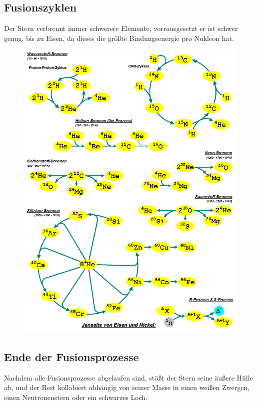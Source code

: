 \documentclass[final]{summery_5.0}
\begin{document}
\subsection{Fusionszyklen}
Der Stern verbrennt immer schwerere Elemente, vorrausgesetzt er ist schwer genug, bis zu Eisen, da dieses die größte Bindungsenergie pro Nukleon hat. 
\begin{figure}[H]
    \centering
    \includegraphics[width=1\textwidth]{schaalenbrenne.png}
\end{figure}

\subsection{Ende der Fusionsprozesse}
Nachdem alle Fusionsprozesse abgelaufen sind, stößt der Stern seine äußere Hülle ab, und der Rest kollabiert abhängig von seiner Masse in einen weißen Zwergen, einen Neutronenstern oder ein schwarzes Loch.
\end{document}
